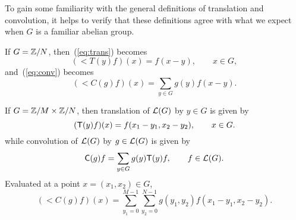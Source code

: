 To gain some familiarity with the general 
definitions of translation %
and convolution, %
it helps to verify 
that these definitions agree with what we expect 
when $G$ is a familiar abelian group. 
\begin{example}
If $G=\mathbb{Z}/N$, then~(\ref{eq:trans}) becomes
\begin{equation}
(\lt{T}(y)f)(x) = f(x-y),  \qquad x \in G,
\end{equation}
and~(\ref{eq:conv}) becomes
\begin{equation}
(\lt{C}(g)f)(x) =\sum_{y \in G} g(y)f(x-y).
\end{equation}
\end{example}
\begin{example}
If $G = \mathbb{Z}/M \times \mathbb{Z}/N$, then translation of $\mathcal{L}(G)$ by
$y\in G$ is given by 
\[
(\mathsf{T}(y)f)(x) = f(x_1-y_1, x_2-y_2), \qquad x \in G.
\]
while convolution of $\mathcal{L}(G)$ by $g\in \mathcal{L}(G)$ is given by
\[
\mathsf{C}(g)f = \sum_{y \in G}g(y)\mathsf{T}(y)f, \qquad f \in \mathcal{L}(G).
\]
Evaluated at a point $x = (x_1,x_2) \in G$,
\[
(\lt{C}(g)f)(x) =\sum_{y_1 = 0}^{M-1}\sum_{y_2=0}^{N-1}g(y_1,y_2)f(x_1-y_1,x_2-y_2).
\]
\end{example}
